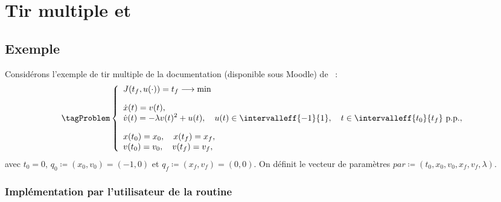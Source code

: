 \section{Tir multiple et \hampath}

\subsection{Exemple}

Consid\'erons l'exemple de tir multiple de la documentation (disponible sous Moodle) de \hampath~:
\leqnomode
\begin{equation}\label{eq:pbmultiple}
    \tagProblem
        \left\{
            \begin{array}{l}
                \displaystyle J(t_f,u(\cdot)) = t_f \longrightarrow \min                                \\[1.0em]
                \displaystyle \dot{x}(t) = v(t), \\
                \displaystyle \dot{v}(t) = -\lambda v(t)^2+u(t), \quad u(t) \in \intervalleff{-1}{1}, 
                \quad t \in \intervalleff{t_0}{t_f} \text{ p.p.},                                       \\[1.0em]
                \displaystyle x(t_0) = x_0,   \quad x(t_f) = x_f,                                       \\
                \displaystyle v(t_0) = v_0,   \quad v(t_f) = v_f,
            \end{array} 
        \right.
\end{equation}
\reqnomode
avec $t_0 = 0$, $q_0 \coloneqq (x_0,v_0) = (-1,0)$ et $q_f \coloneqq (x_f,v_f) = (0,0)$.
On d\'efinit le vecteur de param\`etres $par \coloneqq (t_0, x_0, v_0, x_f, v_f, \lambda)$.

\subsubsection{Impl\'ementation par l'utilisateur de la routine \fortran\ }
\label{sec:hfun_multiple_shooting}

